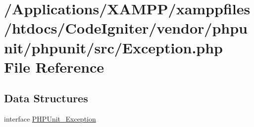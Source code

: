 \hypertarget{phpunit_2phpunit_2src_2_exception_8php}{}\section{/\+Applications/\+X\+A\+M\+P\+P/xamppfiles/htdocs/\+Code\+Igniter/vendor/phpunit/phpunit/src/\+Exception.php File Reference}
\label{phpunit_2phpunit_2src_2_exception_8php}
\subsection*{Data Structures}
\begin{DoxyCompactItemize}
\item 
interface \mbox{\hyperlink{interface_p_h_p_unit___exception}{P\+H\+P\+Unit\+\_\+\+Exception}}
\end{DoxyCompactItemize}
